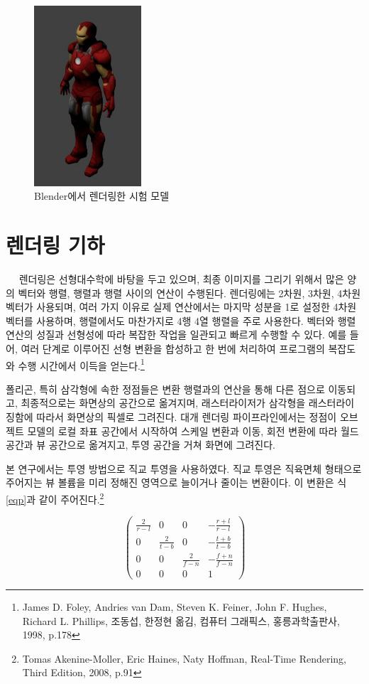 \documentclass[a4paper,itemph,amsmath,oneside,11pt,openany]{xoblivoir}
\begin{document}
\begin{figure}[H]
\centering
\includegraphics[width=40mm]{img/model}
\caption{Blender에서 렌더링한 시험 모델}
\end{figure}


\section{렌더링 기하}
　 렌더링은 선형대수학에 바탕을 두고 있으며, 최종 이미지를 그리기 위해서 많은 양의 벡터와 행렬,
행렬과 행렬 사이의 연산이 수행된다. 렌더링에는 2차원, 3차원, 4차원 벡터가 사용되며, 여러 가지 이유로
실제 연산에서는 마지막 성분을 1로 설정한 4차원 벡터를 사용하며, 행렬에서도 마찬가지로 4행 4열 행렬을 주로 사용한다.
벡터와 행렬 연산의 성질과 선형성에 따라 복잡한 작업을 일관되고 빠르게 수행할 수 있다. 예를 들어, 여러 단계로 이루어진
선형 변환을 합성하고 한 번에 처리하여 프로그램의 복잡도와 수행 시간에서 이득을 얻는다.\footnote{\cite{korea}James D. Foley, Andries van Dam, Steven K. Feiner, John F. Hughes, Richard L. Phillips, 조동섭, 한정현 옮김, 컴퓨터 그래픽스, 홍릉과학출판사, 1998, p.178}

폴리곤, 특히 삼각형에 속한 정점들은 변환 행렬과의 연산을 통해 다른 점으로 이동되고, 최종적으로는 화면상의 공간으로 옮겨지며,
래스터라이저가 삼각형을 래스터라이징함에 따라서 화면상의 픽셀로 그려진다. 대개 렌더링 파이프라인에서는 정점이 오브젝트 모델의
로컬 좌표 공간에서 시작하여 스케일 변환과 이동, 회전 변환에 따라 월드 공간과 뷰 공간으로 옮겨지고,
투영 공간을 거쳐 화면에 그려진다.

본 연구에서는 투영 방법으로 직교 투영을 사용하였다. 직교 투영은 직육면체 형태으로 주어지는 뷰 볼륨을 미리 정해진 영역으로
늘이거나 줄이는 변환이다. 이 변환은 식 \ref{eqp}과 같이 주어진다.\footnote{\cite{rtr}Tomas Akenine-Moller, Eric Haines, Naty Hoffman, Real-Time Rendering, Third Edition, 2008, p.91}

\begin{equation}
\begin{pmatrix}
\frac{2}{r-l} & 0 & 0 & -\frac{r+l}{r-l} \\
0 & \frac{2}{t-b} & 0 & -\frac{t+b}{t-b} \\
0 & 0 & \frac{2}{f-n} & -\frac{f+n}{f-n} \\
0 & 0 & 0 & 1
\end{pmatrix}
\label{eqp}
\end{equation}
\end{document}
